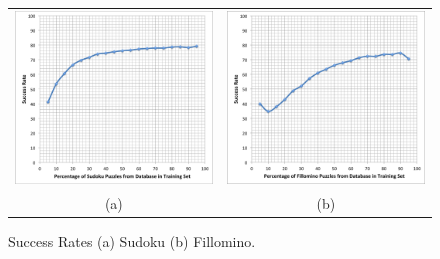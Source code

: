 \begin{figure}[!htpb]
\centering
\begin{tabular}{c c}
\includegraphics[scale=0.40]{experimentgraphs/sudokuSuccessRate2.png}
&
\includegraphics[scale=0.40]{experimentgraphs/fillominoSuccessRate2.png}
\\
(a) & (b)
\end{tabular}
\caption{Success Rates (a) Sudoku (b) Fillomino.}
\label{successrates}
\end{figure}

